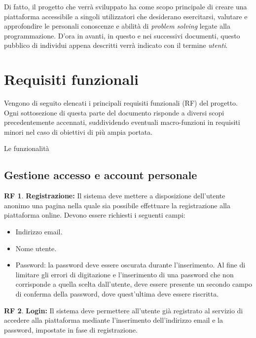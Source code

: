 \documentclass[11pt, a4paper]{article}
\theoremstyle{definition}
\newtheorem{funcreq}{RF} %
\begin{document}
Di fatto, il progetto che verrà sviluppato ha come scopo principale di
creare una piattaforma accessibile a singoli utilizzatori che desiderano
esercitarsi, valutare e approfondire le personali conoscenze e abilità di
\textit{problem solving} legate alla programmazione.
D'ora in avanti, in questo e nei successivi documenti, questo pubblico di
individui appena descritti verrà indicato con il termine \textit{utenti}.

\newpage
\section{Requisiti funzionali}
Vengono di seguito elencati i principali requisiti funzionali (RF)
del progetto. Ogni sottosezione di questa parte del documento
risponde a diversi scopi precedentemente accennati, suddividendo
eventuali macro-funzioni in requisiti minori nel caso di obiettivi
di più ampia portata.

Le funzionalità 


\subsection{Gestione accesso e account personale}

\begin{funcreq}
\textbf{Registrazione:}
Il sistema deve mettere a disposizione dell'utente anonimo una pagina
nella quale sia possibile effettuare la registrazione alla piattaforma
online. Devono essere richiesti i seguenti campi:
\begin{itemize}
    \item Indirizzo email.
    \item Nome utente.
    \item Password: la password deve essere oscurata durante l'inserimento.
    Al fine di limitare gli errori di digitazione e l'inserimento di una
    password che non corrisponde a quella scelta dall'utente, deve essere
    presente un secondo campo di conferma della password, dove quest'ultima
    deve essere riscritta.
\end{itemize}
\end{funcreq}

\begin{funcreq}
\label{login}
\textbf{Login:}
Il sistema deve permettere all'utente già registrato al servizio di
accedere alla piattaforma mediante l'inserimento dell'indirizzo
email e la password, impostate in fase di registrazione.
\end{funcreq}
\end{document}
